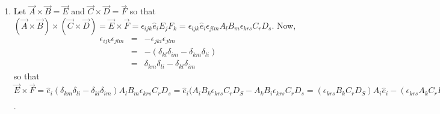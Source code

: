 \documentclass{report}
\begin{document}
\begin{enumerate}
\begin{enumerate}
\item[(c)] Let $\vec{A} \times \vec{B} = \vec{E}$ and $\vec{C} \times 
\vec{D} = \vec{F}$ so that  $(\vec{A} \times \vec{B}) \times (\vec{C} 
\times \vec{D}) = \vec{E} \times \vec{F} = \epsilon_{ijk}\hat{e}_iE_jF_k
= \epsilon_{ijk}\hat{e}_i\epsilon_{jlm}A_lB_m\epsilon_{krs}C_rD_s$. Now,
\begin{eqnarray*}
\epsilon_{ijk}\epsilon_{jlm} &=& -\epsilon_{jki}\epsilon_{jlm} \\
 &=& -(\delta_{kl}\delta_{im} - \delta_{km}\delta_{li}) \\
 &=& \delta_{km}\delta_{li} - \delta_{kl}\delta_{im}
\end{eqnarray*}
so that $\vec{E} \times \vec{F} = \hat{e}_i(\delta_{km}\delta_{li} - 
\delta_{kl}\delta_{im})A_lB_m\epsilon_{krs}C_rD_s = \hat{e}_i(A_iB_k
\epsilon_{krs}C_rD_S - A_kB_i\epsilon_{krs}C_rD_s = 
(\epsilon_{krs}B_kC_rD_S)A_i\hat{e}_i - (\epsilon_{krs}A_kC_rD_s)B_i
\hat{e}_i = (\vec{B}\cdot(\vec{C} \times \vec{D}))\vec{A} - (\vec{A}\cdot
(\vec{C} \times \vec{D}))\vec{B}$.
\end{enumerate}
\end{enumerate}
\end{document}
